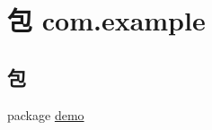 \hypertarget{namespacecom_1_1example}{}\section{包 com.\+example}
\label{namespacecom_1_1example}
\subsection*{包}
\begin{DoxyCompactItemize}
\item 
package \mbox{\hyperlink{namespacecom_1_1example_1_1demo}{demo}}
\end{DoxyCompactItemize}
